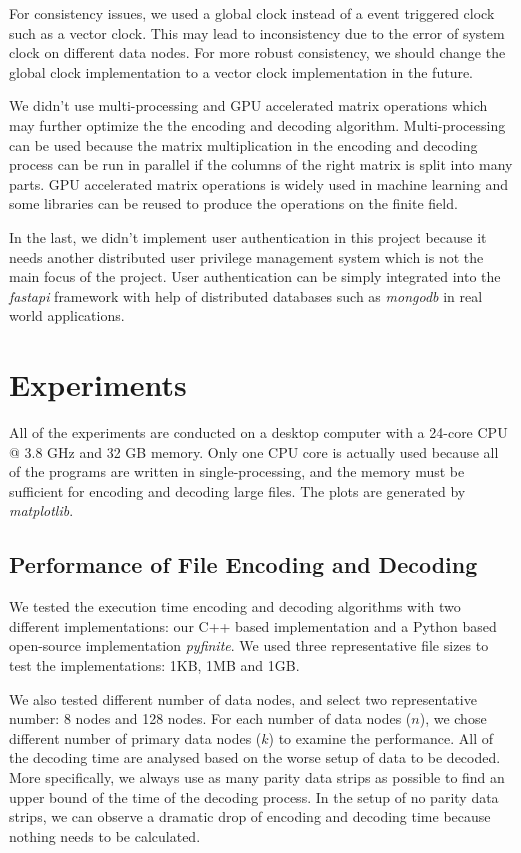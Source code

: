\documentclass[conference]{IEEEtran}
\begin{document}
For consistency issues, we used a global clock instead of a event triggered clock such as a vector clock. This may lead to inconsistency due to the error of system clock on different data nodes. For more robust consistency, we should change the global clock implementation to a vector clock implementation in the future. 

We didn't use multi-processing and GPU accelerated matrix operations which may further optimize the the encoding and decoding algorithm. Multi-processing can be used because the matrix multiplication in the encoding and decoding process can be run in parallel if the columns of the right matrix is split into many parts. GPU accelerated matrix operations is widely used in machine learning and some libraries can be reused to produce the operations on the finite field. 

In the last, we didn't implement user authentication in this project because it needs another distributed user privilege management system which is not the main focus of the project. User authentication can be simply integrated into the \textit{fastapi} framework with help of distributed databases such as \textit{mongodb} in real world applications. 

\section{Experiments}

All of the experiments are conducted on a desktop computer with a 24-core CPU @ 3.8 GHz and 32 GB memory. Only one CPU core is actually used because all of the programs are written in single-processing, and the memory must be sufficient for encoding and decoding large files. The plots are generated by \textit{matplotlib}\cite{Hunter:2007}.

\subsection{Performance of File Encoding and Decoding}

We tested the execution time encoding and decoding algorithms with two different implementations: our C++ based implementation and a Python based open-source implementation \textit{pyfinite}. We used three representative file sizes to test the implementations: 1KB, 1MB and 1GB. 

We also tested different number of data nodes, and select two representative number: 8 nodes and 128 nodes. For each number of data nodes ($n$), we chose different number of primary data nodes ($k$) to examine the performance. All of the decoding time are analysed based on the worse setup of data to be decoded. More specifically, we always use as many parity data strips as possible to find an upper bound of the time of the decoding process. In the setup of no parity data strips, we can observe a dramatic drop of encoding and decoding time because nothing needs to be calculated. 
\end{document}
